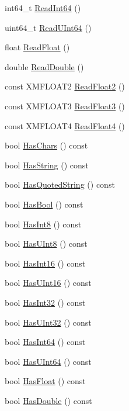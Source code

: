 \begin{DoxyCompactItemize}
\item 
int64\+\_\+t \hyperlink{classmage_1_1_line_reader_af78e657c17cfff3bfc5fed42fbc47085}{Read\+Int64} ()
\item 
uint64\+\_\+t \hyperlink{classmage_1_1_line_reader_ac05624eb7a786bfc1391b22095da1e71}{Read\+U\+Int64} ()
\item 
float \hyperlink{classmage_1_1_line_reader_ae691928873b110dd273e72a47f2008cb}{Read\+Float} ()
\item 
double \hyperlink{classmage_1_1_line_reader_a17f11afdea4692395115c6bdfde03660}{Read\+Double} ()
\item 
const X\+M\+F\+L\+O\+A\+T2 \hyperlink{classmage_1_1_line_reader_ae33effd33fad465616e3acf8acdc408f}{Read\+Float2} ()
\item 
const X\+M\+F\+L\+O\+A\+T3 \hyperlink{classmage_1_1_line_reader_a7a605a7c2402051f1ca4fda1e543fc28}{Read\+Float3} ()
\item 
const X\+M\+F\+L\+O\+A\+T4 \hyperlink{classmage_1_1_line_reader_aaa21896aa756c3402cfeb207ef5f2029}{Read\+Float4} ()
\item 
bool \hyperlink{classmage_1_1_line_reader_a7eb54d60902d1fb7846ea5c566312a0f}{Has\+Chars} () const
\item 
bool \hyperlink{classmage_1_1_line_reader_a011b5a0d1bd2d157033e3bf7d7323aed}{Has\+String} () const
\item 
bool \hyperlink{classmage_1_1_line_reader_ac92de9a3d986c7031c902c9489cfaa5a}{Has\+Quoted\+String} () const
\item 
bool \hyperlink{classmage_1_1_line_reader_ac18069cc6bc399ce6ad8ad069a073c6c}{Has\+Bool} () const
\item 
bool \hyperlink{classmage_1_1_line_reader_a1eecd5324b2e212826c49e600cc46e1f}{Has\+Int8} () const
\item 
bool \hyperlink{classmage_1_1_line_reader_a7d9359c8a65005358564728be9091fa8}{Has\+U\+Int8} () const
\item 
bool \hyperlink{classmage_1_1_line_reader_a36b83e0adfa48d9226ae59c23df8f44a}{Has\+Int16} () const
\item 
bool \hyperlink{classmage_1_1_line_reader_a15c7c3336330649062556e5b318af510}{Has\+U\+Int16} () const
\item 
bool \hyperlink{classmage_1_1_line_reader_af8402b39637e27877eac2909604bbf89}{Has\+Int32} () const
\item 
bool \hyperlink{classmage_1_1_line_reader_a56f82d5562d0254ec59871a3bb7ad837}{Has\+U\+Int32} () const
\item 
bool \hyperlink{classmage_1_1_line_reader_a3a7883e24fb3108a79ecda4eaac983f2}{Has\+Int64} () const
\item 
bool \hyperlink{classmage_1_1_line_reader_ad311b6edbfc68c01997f90cd1db5d95e}{Has\+U\+Int64} () const
\item 
bool \hyperlink{classmage_1_1_line_reader_ade0b6d83fc8cd6a4c64b2c97b9ff0bda}{Has\+Float} () const
\item 
bool \hyperlink{classmage_1_1_line_reader_ad6eb5eaf990bba426498d11c53bd31cd}{Has\+Double} () const
\end{DoxyCompactItemize}
